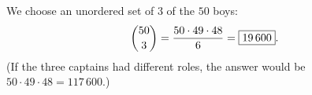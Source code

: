 We choose an unordered set of $3$ of the $50$ boys:
\[\dbinom{50}{3}=\dfrac{50\cdot49\cdot48}{6}=\boxed{19\,600}.\]
(If the three captains had different roles, the answer would be $50\cdot49\cdot48=117\,600$.)
